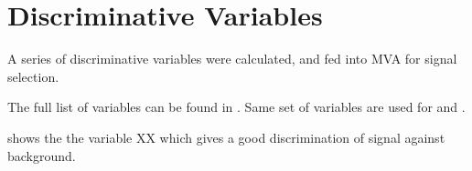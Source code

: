 \section{Discriminative Variables}

A series of discriminative variables were calculated, and fed into MVA for signal selection.

The full list of variables can be found in \Table{}.
Same set of variables are used for  and .

\Figure shows the the variable XX which gives a good discrimination of signal against background.

